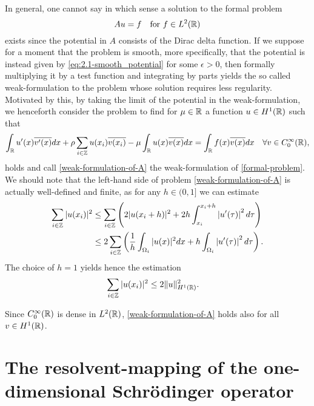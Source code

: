 In general, one cannot say in which sense a solution to the formal problem 
	\begin{equation}
		Au = f \quad \text{for } f \in L^{2}(\mathbb{R}) \label{formal-problem}
	\end{equation}
	exists since the potential in $A$ consists of the Dirac delta function. If we suppose for a moment that the problem is smooth, more specifically, that the potential is instead given by \eqref{eq:2.1-smooth_potential} for some $\epsilon > 0$, then formally multiplying it by a test function and integrating by parts yields the so called weak-formulation to the problem whose solution requires less regularity. Motivated by this, by taking the limit of the potential in the weak-formulation, we henceforth consider the problem to find for $\mu \in \mathbb{R}$ a function $u \in H^{1}(\mathbb{R})$ such that
\begin{equation}
	\int_{\mathbb{R}} u'(x) \overline{v'(x)} dx + \rho \sum_{i \in \mathbb{Z}} u(x_{i}) \overline{v(x_{i})} - \mu \int_{\mathbb{R}} u(x) \overline{v(x)} dx = \int_{\mathbb{R}} f(x) \overline{v(x)} dx \quad \forall v \in C_{0}^{\infty}(\mathbb{R}), \label{weak-formulation-of-A}
\end{equation}	
holds and call \eqref{weak-formulation-of-A} the weak-formulation of \eqref{formal-problem}. We should note that the left-hand side of problem \eqref{weak-formulation-of-A} is actually well-defined and finite, as for any $h \in (0, 1]$ we can estimate
\begin{align}
	\sum_{i \in \mathbb{Z}} |u(x_{i})|^{2} & \leq \sum_{i \in \mathbb{Z}} \left( 2 |u( x_{i} + h )|^{2} +  2 h \int_{x_{i}}^{x_{i} + h} \left| u'(\tau) \right|^{2} d\tau \right) \notag \\
		 & \leq 2 \sum_{i \in \mathbb{Z}} \left( \frac{1}{h} \int_{\Omega_{i}} |u( x )|^{2} dx + h \int_{\Omega_{i}} \left| u'(\tau) \right|^{2} d\tau \right). \label{preestimation-for-potential}
\end{align}
The choice of $h = 1$ yields hence the estimation
\begin{align} 
		\sum_{i \in \mathbb{Z}} |u(x_{i})|^{2} & \leq 2 \| u \|^{2}_{H^{1}(\mathbb{R})}. \label{estimation-for-potential}
\end{align}

\begin{remark}
	Since $C_{0}^{\infty}(\mathbb{R})$ is dense in $L^{2}(\mathbb{R})$, \eqref{weak-formulation-of-A} holds also for all $v \in H^{1}(\mathbb{R})$.
\end{remark}

\section{The resolvent-mapping of the one-dimensional Schrödinger operator} \label{sec:3.1}

